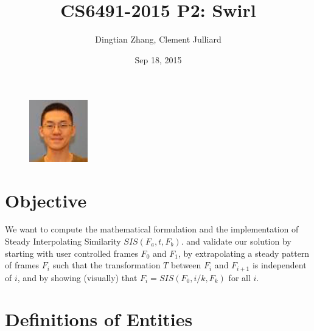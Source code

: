 \documentclass[twoside,11pt]{article}
\begin{document}
\title{CS6491-2015 P2: Swirl}
\author{Dingtian Zhang, Clement Julliard}
\date{Sep 18, 2015}
\maketitle
\begin{figure} [H]
    \centering
    \includegraphics[width=1.0in]{pic_alan}
\end{figure}




\section{Objective}

We want to compute the mathematical formulation and the implementation of Steady Interpolating Similarity $SIS(F_a,t,F_b)$. and validate our solution by starting with user controlled frames $F_0$ and $F_1$, by extrapolating a steady pattern of frames $F_i$ such that the transformation $T$ between $F_i$ and $F_{i+1}$ is independent of $i$, and by showing (visually) that $F_i = SIS(F_0,i/k,F_k)$ for all $i$.


\section{Definitions of Entities}
\end{document}
